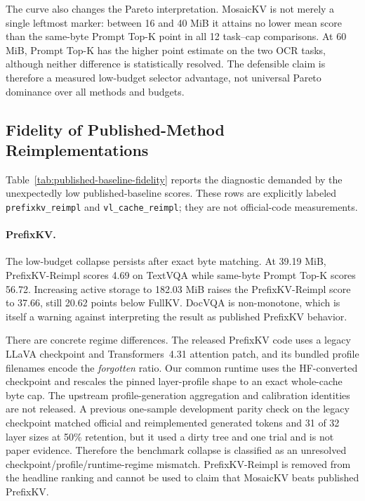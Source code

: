 


The curve also changes the Pareto interpretation.  MosaicKV is not merely a
single leftmost marker: between 16 and 40 MiB it attains no lower mean score
than the same-byte Prompt Top-K point in all 12 task--cap comparisons.  At
60 MiB, Prompt Top-K has the higher point estimate on the two OCR tasks,
although neither difference is statistically resolved.  The defensible
claim is therefore a measured low-budget selector advantage, not universal
Pareto dominance over all methods and budgets.

\subsection{Fidelity of Published-Method Reimplementations}
\label{sec:eval-baseline-fidelity}

Table~\ref{tab:published-baseline-fidelity} reports the diagnostic demanded
by the unexpectedly low published-baseline scores.  These rows are explicitly
labeled \texttt{prefixkv\_reimpl} and \texttt{vl\_cache\_reimpl}; they are
not official-code measurements.



\paragraph{PrefixKV.}
The low-budget collapse persists after exact byte matching.  At 39.19 MiB,
PrefixKV-Reimpl scores 4.69 on TextVQA while same-byte Prompt Top-K scores
56.72.  Increasing active storage to 182.03 MiB raises the PrefixKV-Reimpl
score to 37.66, still 20.62 points below FullKV.  DocVQA is non-monotone,
which is itself a warning against interpreting the result as published
PrefixKV behavior.

There are concrete regime differences.  The released PrefixKV code uses a
legacy LLaVA checkpoint and Transformers~4.31 attention patch, and its bundled
profile filenames encode the \emph{forgotten} ratio.  Our common runtime uses
the HF-converted checkpoint and rescales the pinned layer-profile shape to an
exact whole-cache byte cap.  The upstream profile-generation aggregation and
calibration identities are not released.  A previous one-sample development
parity check on the legacy checkpoint matched official and reimplemented
generated tokens and 31 of 32 layer sizes at 50\% retention, but it used a
dirty tree and one trial and is not paper evidence.  Therefore the benchmark
collapse is classified as an unresolved checkpoint/profile/runtime-regime
mismatch.  PrefixKV-Reimpl is removed from the headline ranking and cannot be
used to claim that MosaicKV beats published PrefixKV.

